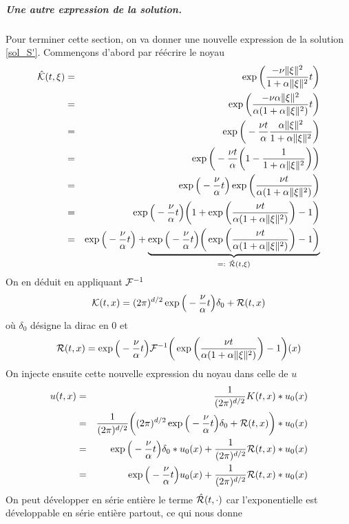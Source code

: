 \subparagraph{Une autre expression de la solution.}
Pour terminer cette section, on va donner une nouvelle expression de la solution \eqref{sol_S'}. Commençons d'abord par réécrire le noyau
\begin{eqnarray*}
    \hat{\mathcal{K}}(t,\xi) &=& \exp\bigg(\frac{-\nu\|\xi\|^2}{1+\alpha\|\xi\|^2}t\bigg) \\
    &=& \exp\bigg(\frac{-\nu\alpha\|\xi\|^2}{\alpha(1+\alpha\|\xi\|^2)}t\bigg)\\
    &=& \exp\bigg(-\frac{\nu t}{\alpha}\frac{\alpha \|\xi\|^2}{1+\alpha\|\xi\|^2}\bigg) \\
    &=& \exp\bigg(-\frac{\nu t}{\alpha}\bigg(1-\frac{1}{1+\alpha\|\xi\|^2}\bigg)\bigg) \\
    &=& \exp\Big(-\frac{\nu}{\alpha}t\Big)\exp\bigg(\frac{\nu t}{\alpha(1+\alpha \|\xi\|^2)}\bigg) \\
    &=& \exp\Big(-\frac{\nu}{\alpha}t\Big)\bigg(1+\exp\bigg(\frac{\nu t}{\alpha(1+\alpha \|\xi\|^2)}\bigg)-1\bigg) \\
    &=& \exp\Big(-\frac{\nu}{\alpha}t\Big) + \underbrace{\exp\Big(-\frac{\nu}{\alpha}t\Big)\bigg(\exp\bigg(\frac{\nu t}{\alpha(1+\alpha \|\xi\|^2)}\bigg)-1\bigg)}_{=: \ \hat{\mathcal{R}}(t,\xi)}
\end{eqnarray*}
On en déduit en appliquant $\mathcal{F}^{-1}$
\begin{equation*}
    \mathcal{K}(t,x) = (2\pi)^{d/2}\exp\Big(-\frac{\nu}{\alpha}t\Big)\delta_0 + \mathcal{R}(t,x)
\end{equation*}
où $\delta_0$ désigne la dirac en $0$ et
\begin{equation*}
    \mathcal{R}(t,x) = \exp\Big(-\frac{\nu}{\alpha}t\Big)\mathcal{F}^{-1}\bigg(\exp\bigg(\frac{\nu t}{\alpha(1+\alpha \|\xi\|^2)}\bigg)-1\bigg)(x)
\end{equation*}
On injecte ensuite cette nouvelle expression du noyau dans celle de $u$
\begin{eqnarray*}
    u(t,x) &=& \frac{1}{(2\pi)^{d/2}}K(t,x)*u_0(x) \\
    &=& \frac{1}{(2\pi)^{d/2}}\bigg((2\pi)^{d/2}\exp\Big(-\frac{\nu}{\alpha}t\Big)\delta_0 + \mathcal{R}(t,x)\bigg)*u_0(x) \\
    &=& \exp\Big(-\frac{\nu}{\alpha}t\Big)\delta_0*u_0(x) + \frac{1}{(2\pi)^{d/2}}\mathcal{R}(t,x)*u_0(x) \\
    &=& \exp\Big(-\frac{\nu}{\alpha}t\Big)u_0(x) + \frac{1}{(2\pi)^{d/2}}\mathcal{R}(t,x)*u_0(x)
\end{eqnarray*}
On peut développer en série entière le terme $\hat{\mathcal{R}}(t,\cdot)$ car l'exponentielle est développable en série entière partout, ce qui nous donne
